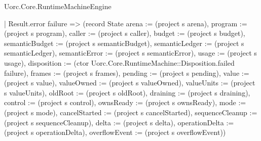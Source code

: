 \begin{lexlean}{Uorc.Core.RuntimeMachineEngine}
\begin{semanticmodule}
{        | Result.error failure => (record State {arena := (project s arena), program := (project s program), caller := (project s caller), budget := (project s budget), semanticBudget := (project s semanticBudget), semanticLedger := (project s semanticLedger), semanticError := (project s semanticError), usage := (project s usage), disposition := (ctor Uorc.Core.RuntimeMachine::Disposition.failed failure), frames := (project s frames), pending := (project s pending), value := (project s value), valueOwned := (project s valueOwned), valueUnits := (project s valueUnits), oldRoot := (project s oldRoot), draining := (project s draining), control := (project s control), ownsReady := (project s ownsReady), mode := (project s mode), cancelStarted := (project s cancelStarted), sequenceCleanup := (project s sequenceCleanup), delta := (project s delta), operationDelta := (project s operationDelta), overflowEvent := (project s overflowEvent)})
}
\end{semanticmodule}
\end{lexlean}
